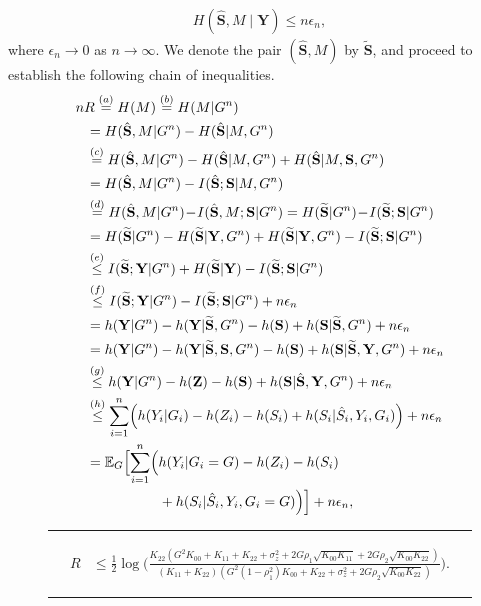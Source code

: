\documentclass[journal]{IEEEtran}
\def\eE{\mathbb E}
\def\eE{\mathbb E}
\def\bS{\mathbf S}
\def\bY{\mathbf Y}
\def\bhS{\hat{\mathbf S}}
\def\bZ{\mathbf Z}
\def\bhS{\hat{\mathbf S}}
\def\btS{\widetilde{\mathbf S}}
\begin{document}
\begin{align}
    H(\bhS,M \mid \bY) \leq n \epsilon_n, \label{eq:fano:1}
\end{align}
where $\epsilon_n \to 0$ as $n \to \infty$. 
We denote the pair $(\bhS, M)$ by $\btS$, and proceed to establish the following chain of inequalities.
\begin{align}
&nR \stackrel{(a)}=   H(M) \stackrel{(b)}= H(M|G^n) \notag\\
    &\phantom{w}= H(\bhS,M|G^n) - H(\bhS|M,G^n) \notag\\
    &\phantom{w}\stackrel{(c)}= H(\bhS,M|G^n) - H(\bhS|M,G^n)+H(\bhS|M,\bS,G^n) \notag\\
     &\phantom{w}= H(\bhS,M|G^n) - I(\bhS;\bS|M,G^n) \notag\\
     &\phantom{w}\stackrel{(d)}= H(\bhS,M|G^n) \!-\! I(\bhS,M;\bS|G^n) = H(\btS|G^n) \!-\! I(\btS;\bS|G^n) \notag\\
     &\phantom{w}= H(\btS|G^n)-H(\btS|\bY,G^n)+H(\btS|\bY,G^n) - I(\btS;\bS|G^n) \notag\\
     &\phantom{w}\stackrel{(e)}\leq I(\btS;\bY|G^n) + H(\btS|\bY) - I(\btS;\bS|G^n) \notag\\
     &\phantom{w}\stackrel{(f)}\leq I(\btS;\bY|G^n) - I(\btS;\bS|G^n) + n\epsilon_n \notag\\
&\phantom{w}= h(\bY|G^n) - h(\bY|\btS,G^n)- h(\bS)  +  h(\bS|\btS,G^n)+ n\epsilon_n \notag\\
&\phantom{w}= h(\bY|G^n) - h(\bY|\btS,\bS,G^n)- h(\bS)+  h(\bS|\btS,\bY,G^n)+ n\epsilon_n \notag\\
&\phantom{w}\stackrel{(g)}\leq h(\bY|G^n) - h(\bZ)- h(\bS)+  h(\bS|\bhS,\bY,G^n)+ n\epsilon_n \notag\\
&\phantom{w}\stackrel{(h)}\leq \sum_{i=1}^n \Bigl(h(Y_i|G_i)-h(Z_i)-h(S_i)+h(S_i|\hat{S}_i,Y_i,G_i)\Bigr) + n\epsilon_n \notag\\
&\phantom{w}= \eE_{G}\Bigl[\sum_{i=1}^n \Bigl(h(Y_i|G_i=G)-h(Z_i)-h(S_i) \notag\\
&\phantom{wwwwwwww}+h(S_i|\hat{S}_i,Y_i,G_i=G)\Bigr)\Bigr] + n\epsilon_n,%
	\label{eq:r1mur2:1}
\end{align}

\begin{figure}
\hrule
\begin{align}
R &\leq \frac{1}{2}\log\Bigg(\frac{K_{22}(G^2 K_{00} +K_{11}+K_{22}+\sigma_z^2+  2G \rho_1\sqrt{K_{00}K_{11}} +  2G \rho_2\sqrt{K_{00}K_{22}})}{(K_{11}+K_{22})(G^2 (1-\rho_1^2) K_{00} +K_{22}+\sigma_z^2 +  2G \rho_2\sqrt{K_{00}K_{22}})
}\Bigg).
\label{eq:ConverseRupperbound}
\end{align}
\hrule
\end{figure}
\end{document}
